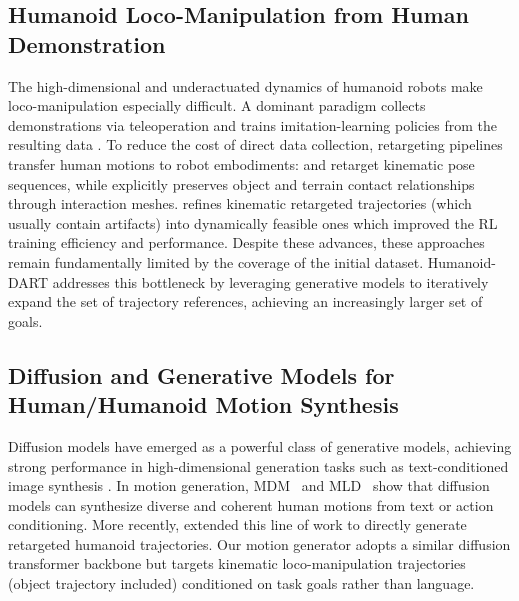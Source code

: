 \documentclass{article}
\newcommand{\papertitle}{Humanoid-DART}
\begin{document}
\subsection{Humanoid Loco-Manipulation from Human Demonstration}

The high-dimensional and underactuated dynamics of humanoid robots make loco-manipulation
especially difficult.
A dominant paradigm collects demonstrations via teleoperation and trains imitation-learning policies from the resulting data \cite{seo2023deep, he2024omnih2ouniversaldexteroushumantohumanoid, he2024humanplus}.
To reduce the cost of direct data collection, retargeting pipelines transfer human motions to robot embodiments: \cite{araujo2025retargeting} and \cite{he2024learning} retarget kinematic pose sequences, while \cite{yang2025omniretarget} explicitly preserves object and terrain contact relationships through interaction meshes. \cite{dhedin2026dynaretargetdynamicallyfeasibleretargetingusing, pan2025spider} refines kinematic retargeted trajectories (which usually contain artifacts) into dynamically feasible ones which improved the RL training efficiency and performance.
%
Despite these advances, these approaches remain fundamentally limited by the coverage of the initial dataset. {\papertitle} addresses this bottleneck by leveraging generative models to iteratively expand the set of trajectory references, achieving an increasingly larger set of goals.


\subsection{Diffusion and Generative Models for Human/Humanoid Motion Synthesis}

Diffusion models \cite{ho2020denoisingdiffusionprobabilisticmodels} have emerged as a powerful class of generative models, achieving strong performance in high-dimensional generation tasks such as text-conditioned image synthesis \cite{rombach2022highresolutionimagesynthesislatent}.
In motion generation, MDM~\cite{tevet2022humanmotiondiffusionmodel} and MLD~\cite{chen2023mld} show that diffusion models can synthesize diverse and coherent human motions from text or action conditioning. More recently, \cite{xie2026textoprealtimeinteractivetextdriven, Kimodo2026} extended this line of work to directly generate retargeted humanoid trajectories.
%
Our motion generator adopts a similar diffusion transformer backbone but targets kinematic loco-manipulation trajectories (object trajectory included) conditioned on task goals rather than language.
\end{document}
